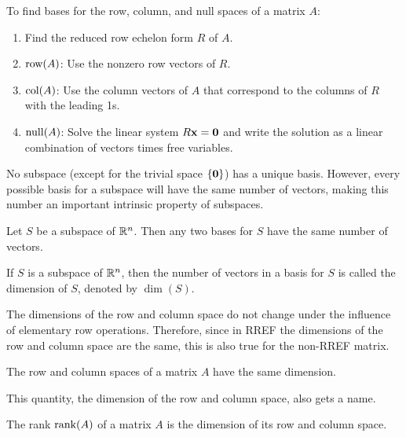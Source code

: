 \documentclass[../m73main.tex]{chapters}
\begin{document}
\begin{definition}
	To find bases for the row, column, and null spaces of a matrix $A$:
	\begin{enumerate}
		\item Find the reduced row echelon form $R$ of $A$.
		\item $\textrm{row}(A)$: Use the nonzero row vectors of $R$.
		\item $\textrm{col}(A)$: Use the column vectors of $A$ that correspond to the columns of $R$ with the leading 1s.
		\item $\textrm{null}(A)$: Solve the linear system $R\mathbf{x} = \mathbf{0}$ and write the solution as a linear combination of vectors times free variables.
	\end{enumerate}
\end{definition}

No subspace (except for the trivial space $\{ \mathbf{0} \}$) has a unique basis.
However, every possible basis for a subspace will have the same number of vectors, making this number an important intrinsic property of subspaces.

\begin{theorem}
	Let $S$ be a subspace of $\mathbb{R}^n$.
	Then any two bases for $S$ have the same number of vectors.
\end{theorem}

\begin{definition}[Dimension]
	If $S$ is a subspace of $\mathbb{R}^n$, then the number of vectors in a basis for $S$ is called the dimension of $S$, denoted by $\dim(S)$.
\end{definition}

The dimensions of the row and column space do not change under the influence of elementary row operations.
Therefore, since in RREF the dimensions of the row and column space are the same, this is also true for the non-RREF matrix.

\begin{theorem}
	The row and column spaces of a matrix $A$ have the same dimension.
\end{theorem}

This quantity, the dimension of the row and column space, also gets a name.

\begin{definition}[Rank]
	The rank $\textrm{rank}(A)$ of a matrix $A$ is the dimension of its row and column space.
\end{definition}
\end{document}
